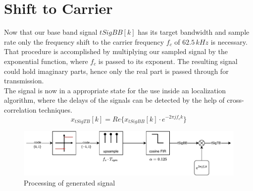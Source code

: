 \section{Shift to Carrier}

Now that our base band signal $tSigBB[k]$ has its target bandwidth and sample rate only the frequency shift to the carrier frequency $f_c$ of $62.5\,kHz$ is necessary. That procedure is accomplished by multiplying our sampled signal by the exponential function, where $f_c$ is passed to its exponent. The resulting signal could hold imaginary parts, hence only the real part is passed through for transmission.\\
The signal is now in a appropriate state for the use inside an localization algorithm, where the delays of the signals can be detected by the help of cross-correlation techniques.
\begin{equation}
	x_{tSigTB}[k]=Re\{x_{tSigBB}[k]\cdot e^{-2\pi j f_c k}\}
	\label{eq:shift}
\end{equation}


%
%
\begin{figure}[h]
	\includegraphics[width=\linewidth]{images/sensig}
	
	\caption{Processing of generated signal}
	\label{fig:sensig}
\end{figure}


